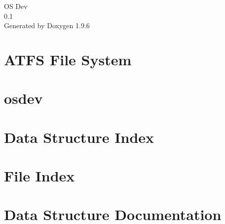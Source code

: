 \documentclass[twoside]{book}
\newcommand{\+}{\discretionary{\mbox{\scriptsize$\hookleftarrow$}}{}{}}
\newcommand{\clearemptydoublepage}{%
    \newpage{\pagestyle{empty}\cleardoublepage}%
  }
\begin{document}
  \raggedbottom
    \hypersetup{pageanchor=false,
                bookmarksnumbered=true,
                pdfencoding=unicode
               }
  \begin{titlepage}
  \vspace*{7cm}
  \begin{center}%
  {\Large OS Dev}\\
  [1ex]\large 0.\+1 \\
  \vspace*{1cm}
  {\large Generated by Doxygen 1.9.6}\\
  \end{center}
  \end{titlepage}
  \clearemptydoublepage
  \tableofcontents
  \clearemptydoublepage
  \hypersetup{pageanchor=true}
\chapter{ATFS File System}
\label{md_atfs_ATFS}

\chapter{osdev}
\label{md_README}

\chapter{Data Structure Index}

\chapter{File Index}

\chapter{Data Structure Documentation}

















\end{document}
